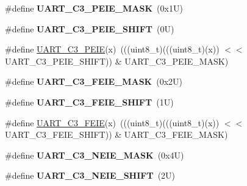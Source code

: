 \begin{DoxyCompactItemize}
\item 
\mbox{\label{group___u_a_r_t___register___masks_gadf1ad2301848b5812b84658d02cc2006}} 
\#define {\bfseries U\+A\+R\+T\+\_\+\+C3\+\_\+\+P\+E\+I\+E\+\_\+\+M\+A\+SK}~(0x1\+U)
\item 
\mbox{\label{group___u_a_r_t___register___masks_gad14f9faaee56b818a04794694960fa6a}} 
\#define {\bfseries U\+A\+R\+T\+\_\+\+C3\+\_\+\+P\+E\+I\+E\+\_\+\+S\+H\+I\+FT}~(0\+U)
\item 
\#define \mbox{\hyperlink{group___u_a_r_t___register___masks_gab96d251fa95f8fdd25ae55374c23f698}{U\+A\+R\+T\+\_\+\+C3\+\_\+\+P\+E\+IE}}(x)~(((uint8\+\_\+t)(((uint8\+\_\+t)(x)) $<$$<$ U\+A\+R\+T\+\_\+\+C3\+\_\+\+P\+E\+I\+E\+\_\+\+S\+H\+I\+FT)) \& U\+A\+R\+T\+\_\+\+C3\+\_\+\+P\+E\+I\+E\+\_\+\+M\+A\+SK)
\item 
\mbox{\label{group___u_a_r_t___register___masks_gaf165d0ae5fd464a2ec367e29d1dedcb2}} 
\#define {\bfseries U\+A\+R\+T\+\_\+\+C3\+\_\+\+F\+E\+I\+E\+\_\+\+M\+A\+SK}~(0x2\+U)
\item 
\mbox{\label{group___u_a_r_t___register___masks_gac08e14a1c915cfa377176fc6d491e38d}} 
\#define {\bfseries U\+A\+R\+T\+\_\+\+C3\+\_\+\+F\+E\+I\+E\+\_\+\+S\+H\+I\+FT}~(1\+U)
\item 
\#define \mbox{\hyperlink{group___u_a_r_t___register___masks_gae7d1ccc17fbd5c274fd85b1e8dca26c3}{U\+A\+R\+T\+\_\+\+C3\+\_\+\+F\+E\+IE}}(x)~(((uint8\+\_\+t)(((uint8\+\_\+t)(x)) $<$$<$ U\+A\+R\+T\+\_\+\+C3\+\_\+\+F\+E\+I\+E\+\_\+\+S\+H\+I\+FT)) \& U\+A\+R\+T\+\_\+\+C3\+\_\+\+F\+E\+I\+E\+\_\+\+M\+A\+SK)
\item 
\mbox{\label{group___u_a_r_t___register___masks_ga1e485aea10f0176919ae060d0ee1d709}} 
\#define {\bfseries U\+A\+R\+T\+\_\+\+C3\+\_\+\+N\+E\+I\+E\+\_\+\+M\+A\+SK}~(0x4\+U)
\item 
\mbox{\label{group___u_a_r_t___register___masks_gae70ab8b995df889314915948d51ae783}} 
\#define {\bfseries U\+A\+R\+T\+\_\+\+C3\+\_\+\+N\+E\+I\+E\+\_\+\+S\+H\+I\+FT}~(2\+U)
\item 

\end{DoxyCompactItemize}
